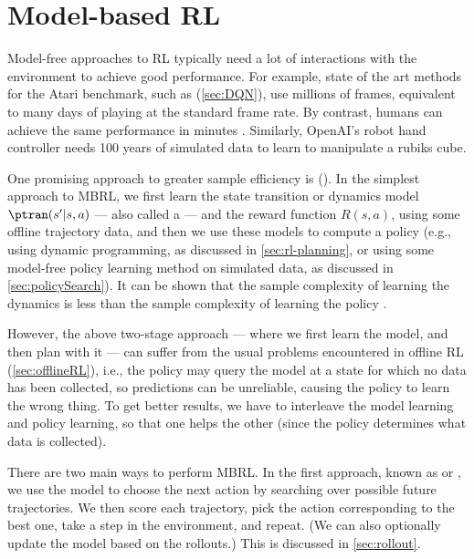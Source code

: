\chapter{Model-based RL}
\label{sec:MBRL}


Model-free approaches to RL typically
need a lot of interactions with the environment
to achieve good performance.
For example, state of the art
methods for the Atari benchmark, such as 
(\cref{sec:DQN}), use millions of frames,
equivalent to many days of playing
at the standard frame rate.
By contrast, humans can achieve the same
performance in minutes \citep{Tsividis2017}.
Similarly,
OpenAI's robot hand controller \citep{Andrychowicz2020}
needs  100 years of simulated data
to 
learn to manipulate a rubiks cube.


One promising approach to greater sample efficiency
is 
().
In the simplest approach to MBRL,
we first learn the state transition or dynamics model
$\ptran(s'|s,a)$ --- also called a  ---
and the reward function $R(s,a)$,
using some offline trajectory data, 
and then we use these models to compute a  policy
(e.g., using dynamic programming, as discussed in
\cref{sec:rl-planning},
or using some model-free policy learning method on simulated data,
as discussed in \cref{sec:policySearch}).
It can be shown that the sample complexity
of learning the dynamics is less than the sample
complexity of learning the policy \citep{Zhu2024iclr}.

However, the above two-stage approach --- where we first learn the model,
and then plan with it --- can suffer from the usual problems
encountered in offline RL (\cref{sec:offlineRL}),
i.e., the policy may query the model at a state
for which no data has been collected, so predictions can be
unreliable, causing the policy to learn the wrong thing.
To get better results, we have to interleave the model learning
and policy learning, so that one helps the other
(since the policy determines what data is collected).

There are two main ways to perform MBRL.
In the first approach,
known as  
or ,
we use the model
to choose the next action by searching over possible future
trajectories.
We then score each trajectory, pick the action corresponding to the best one, take
a step in the environment, and repeat.
(We can also optionally update the model
based on the  rollouts.)
This is discussed in \cref{sec:rollout}.

